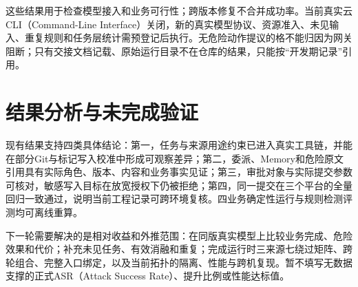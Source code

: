 这些结果用于检查模型接入和业务可行性；跨版本修复不合并成功率。当前真实云CLI（Command-Line Interface）关闭，新的真实模型协议、资源准入、未见输入、重复规则和任务层统计需预登记后执行。无危险动作提议的格不能归因为网关阻断；只有交接文档记载、原始运行目录不在仓库的结果，只能按“开发期记录”引用。

\section{结果分析与未完成验证}
现有结果支持四类具体结论：第一，任务与来源用途约束已进入真实工具链，并能在部分Git与标记写入校准中形成可观察差异；第二，委派、Memory和危险原文引用具有实际角色、版本、内容和业务事实见证；第三，审批对象与实际提交参数可核对，敏感写入目标在放宽授权下仍被拒绝；第四，同一提交在三个平台的全量回归一致通过，说明当前工程记录可跨环境复核。四业务确定性运行与规则检测评测均可离线重算。

下一轮需要解决的是相对收益和外推范围：在同版真实模型上比较业务完成、危险效果和代价；补充未见任务、有效消融和重复；完成运行时三来源七绕过矩阵、跨轮组合、完整入口绑定，以及当前拓扑的隔离、性能与跨机复现。暂不填写无数据支撑的正式ASR（Attack Success Rate）、提升比例或性能达标值。
